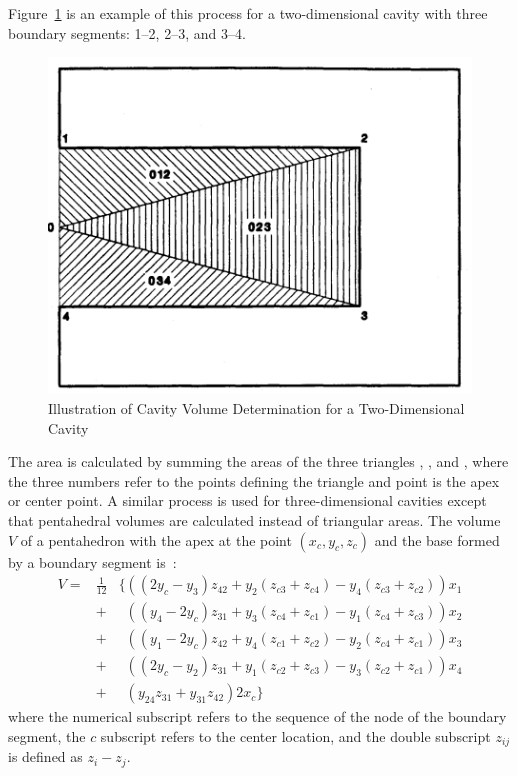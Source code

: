 Figure~\ref{cvol2d} is an example of this process for a two-dimensional
cavity with three boundary segments: 1--2, 2--3, and 3--4.
\begin{figure}
\centering
\includegraphics[scale=0.75]{figures/Cavity.png}
\caption{Illustration of Cavity Volume Determination for
a Two-Dimensional Cavity}\label{cvol2d}
\end{figure}
The area is calculated by summing the areas of the three triangles
{}, {}, and {}, where the three numbers refer to the
points defining the triangle and point {} is the apex or center
point. A similar process is used for three-dimensional cavities except
that pentahedral volumes are calculated instead of triangular areas. The
volume $V$ of a pentahedron with the apex at the point $(x_c,y_c,z_c)$
and the base formed by a boundary segment is~\cite{flanagan}:
\begin{eqnarray}
V = &\frac{1}{12}&\{
 ((2y_c - y_3) z_{42} + y_2 (z_{c3} + z_{c4}) - y_4 (z_{c3} + z_{c2})) x_1 \nonumber \\
&+& \phantom{\{}((y_4 - 2y_c) z_{31} + y_3 (z_{c4} + z_{c1}) - y_1 (z_{c4} + z_{c3})) x_2 \nonumber \\
&+& \phantom{\{}((y_1 - 2y_c) z_{42} + y_4 (z_{c1} + z_{c2}) - y_2 (z_{c4} + z_{c1})) x_3 \nonumber \\
&+& \phantom{\{}((2y_c - y_2) z_{31} + y_1 (z_{c2} + z_{c3}) - y_3 (z_{c2} + z_{c1})) x_4 \nonumber \\
&+& \phantom{\{}(y_{24}   z_{31} + y_{31} z_{42})  2  x_c\}
\end{eqnarray}
where the numerical subscript refers to the sequence of the node of the
boundary segment, the $c$ subscript refers to the center location, and
the double subscript $z_{ij}$ is defined as $z_i-z_j$.

